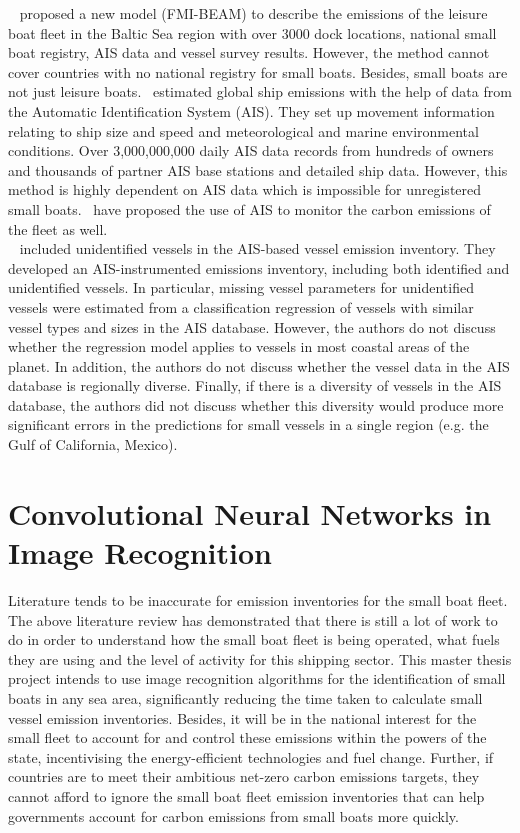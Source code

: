 ~ proposed a new model (FMI-BEAM) to describe the emissions of the leisure boat fleet in the Baltic Sea region with over 3000 dock locations, national small boat registry, AIS data and vessel survey results. However, the method cannot cover countries with no national registry for small boats. Besides, small boats are not just leisure boats.~ estimated global ship emissions with the help of data from the Automatic Identification System (AIS). They set up movement information relating to ship size and speed and meteorological and marine environmental conditions. Over 3,000,000,000 daily AIS data records from hundreds of owners and thousands of partner AIS base stations and detailed ship data. However, this method is highly dependent on AIS data which is impossible for unregistered small boats.~ have proposed the use of AIS to monitor the carbon emissions of the fleet as well.\\

~ included unidentified vessels in the AIS-based vessel emission inventory. They developed an AIS-instrumented emissions inventory, including both identified and unidentified vessels. In particular, missing vessel parameters for unidentified vessels were estimated from a classification regression of vessels with similar vessel types and sizes in the AIS database. However, the authors do not discuss whether the regression model applies to vessels in most coastal areas of the planet. In addition, the authors do not discuss whether the vessel data in the AIS database is regionally diverse. Finally, if there is a diversity of vessels in the AIS database, the authors did not discuss whether this diversity would produce more significant errors in the predictions for small vessels in a single region (e.g. the Gulf of California, Mexico).


\section{Convolutional Neural Networks in Image Recognition}
\label{sec2.2}
Literature tends to be inaccurate for emission inventories for the small boat fleet. The above literature review has demonstrated that there is still a lot of work to do in order to understand how the small boat fleet is being operated, what fuels they are using and the level of activity for this shipping sector. This master thesis project intends to use image recognition algorithms for the identification of small boats in any sea area, significantly reducing the time taken to calculate small vessel emission inventories. Besides, it will be in the national interest for the small fleet to account for and control these emissions within the powers of the state, incentivising the energy-efficient technologies and fuel change. Further, if countries are to meet their ambitious net-zero carbon emissions targets, they cannot afford to ignore the small boat fleet emission inventories that can help governments account for carbon emissions from small boats more quickly.\\

